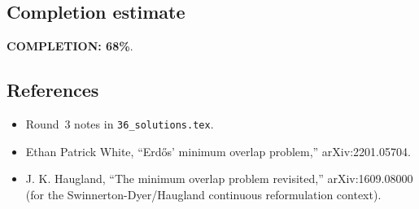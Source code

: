 \subsection{Completion estimate}
\textbf{COMPLETION: 68\%}.

\subsection{References}
\begin{itemize}
\item Round~3 notes in \texttt{36\_solutions.tex}.
\item Ethan Patrick White, ``Erd\H{o}s' minimum overlap problem,'' arXiv:2201.05704.
\item J. K. Haugland, ``The minimum overlap problem revisited,'' arXiv:1609.08000 (for the Swinnerton-Dyer/Haugland continuous reformulation context).
\end{itemize}
